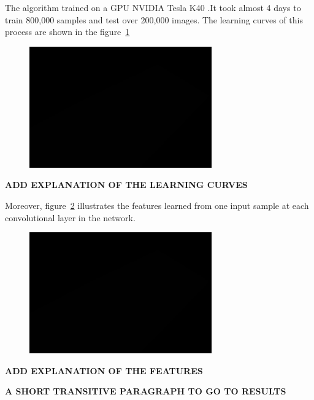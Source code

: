 \noindent The algorithm trained on a GPU NVIDIA \cite{kirk2007nvidia} Tesla K40 \cite{lindholm2008nvidia}.It took almost 4 days to train 800,000 samples and test over 200,000 images. The learning curves of this process are shown in the figure~\ref{fig:curve}

\begin{figure}[H]
	\centering
	{\includegraphics[width=0.7\textwidth]{images/1}}
	\caption{}
	\label{fig:curve}
\end{figure}

\textbf{ADD EXPLANATION OF THE LEARNING CURVES}

\noindent Moreover, figure~\ref{fig:feat} illustrates the features learned from one input sample at each convolutional layer in the network.


\begin{figure}[H]
	\centering
	{\includegraphics[width=0.7\textwidth]{images/1}}
	\caption{}
	\label{fig:feat}
\end{figure}

\textbf{ADD EXPLANATION OF THE FEATURES}
 
\textbf{A SHORT TRANSITIVE PARAGRAPH TO GO TO RESULTS}

